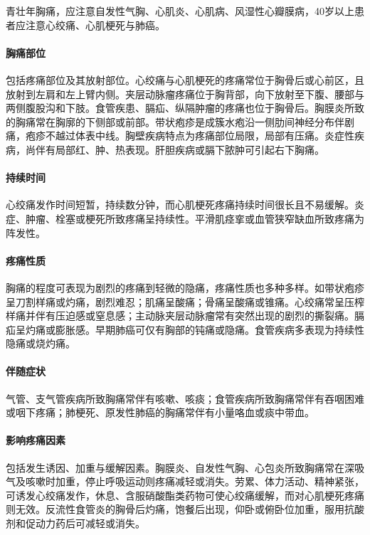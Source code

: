 青壮年胸痛，应注意自发性气胸、心肌炎、心肌病、风湿性心瓣膜病，40岁以上患者应注意心绞痛、心肌梗死与肺癌。

\paragraph{胸痛部位}

包括疼痛部位及其放射部位。心绞痛与心肌梗死的疼痛常位于胸骨后或心前区，且放射到左肩和左上臂内侧。夹层动脉瘤疼痛位于胸背部，向下放射至下腹、腰部与两侧腹股沟和下肢。食管疾患、膈疝、纵隔肿瘤的疼痛也位于胸骨后。胸膜炎所致的胸痛常在胸廓的下侧部或前部。带状疱疹是成簇水疱沿一侧肋间神经分布伴剧痛，疱疹不越过体表中线。胸壁疾病特点为疼痛部位局限，局部有压痛。炎症性疾病，尚伴有局部红、肿、热表现。肝胆疾病或膈下脓肿可引起右下胸痛。

\paragraph{持续时间}

心绞痛发作时间短暂，持续数分钟，而心肌梗死疼痛持续时间很长且不易缓解。炎症、肿瘤、栓塞或梗死所致疼痛呈持续性。平滑肌痉挛或血管狭窄缺血所致疼痛为阵发性。

\paragraph{疼痛性质}

胸痛的程度可表现为剧烈的疼痛到轻微的隐痛，疼痛性质也多种多样。如带状疱疹呈刀割样痛或灼痛，剧烈难忍；肌痛呈酸痛；骨痛呈酸痛或锥痛。心绞痛常呈压榨样痛并伴有压迫感或窒息感；主动脉夹层动脉瘤常有突然出现的剧烈的撕裂痛。膈疝呈灼痛或膨胀感。早期肺癌可仅有胸部的钝痛或隐痛。食管疾病多表现为持续性隐痛或烧灼痛。

\paragraph{伴随症状}

气管、支气管疾病所致胸痛常伴有咳嗽、咳痰；食管疾病所致胸痛常伴有吞咽困难或咽下疼痛；肺梗死、原发性肺癌的胸痛常伴有小量咯血或痰中带血。

\paragraph{影响疼痛因素}

包括发生诱因、加重与缓解因素。胸膜炎、自发性气胸、心包炎所致胸痛常在深吸气及咳嗽时加重，停止呼吸运动则疼痛减轻或消失。劳累、体力活动、精神紧张，可诱发心绞痛发作，休息、含服硝酸酯类药物可使心绞痛缓解，而对心肌梗死疼痛则无效。反流性食管炎的胸骨后灼痛，饱餐后出现，仰卧或俯卧位加重，服用抗酸剂和促动力药后可减轻或消失。

